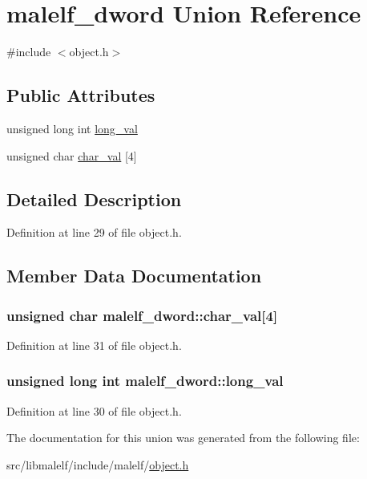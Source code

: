 \hypertarget{unionmalelf__dword}{
\section{malelf\_\-dword Union Reference}
\label{unionmalelf__dword}
}


{\ttfamily \#include $<$object.h$>$}

\subsection*{Public Attributes}
\begin{DoxyCompactItemize}
\item 
unsigned long int \hyperlink{unionmalelf__dword_a22dbf267cecf05067febc84ac0645775}{long\_\-val}
\item 
unsigned char \hyperlink{unionmalelf__dword_a1f65f347531fda3fbcb41779fa674701}{char\_\-val} \mbox{[}4\mbox{]}
\end{DoxyCompactItemize}


\subsection{Detailed Description}


Definition at line 29 of file object.h.



\subsection{Member Data Documentation}
\hypertarget{unionmalelf__dword_a1f65f347531fda3fbcb41779fa674701}{
\subsubsection[{char\_\-val}]{\setlength{\rightskip}{0pt plus 5cm}unsigned char {\bf malelf\_\-dword::char\_\-val}\mbox{[}4\mbox{]}}}
\label{unionmalelf__dword_a1f65f347531fda3fbcb41779fa674701}


Definition at line 31 of file object.h.

\hypertarget{unionmalelf__dword_a22dbf267cecf05067febc84ac0645775}{
\subsubsection[{long\_\-val}]{\setlength{\rightskip}{0pt plus 5cm}unsigned long int {\bf malelf\_\-dword::long\_\-val}}}
\label{unionmalelf__dword_a22dbf267cecf05067febc84ac0645775}


Definition at line 30 of file object.h.



The documentation for this union was generated from the following file:\begin{DoxyCompactItemize}
\item 
src/libmalelf/include/malelf/\hyperlink{object_8h}{object.h}\end{DoxyCompactItemize}
